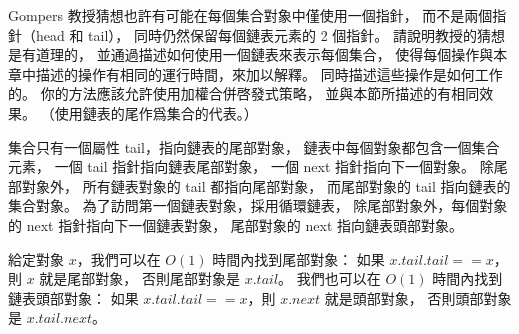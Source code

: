 \startEXERCISE
Gompers 教授猜想也許有可能在每個集合對象中僅使用一個指針，
而不是兩個指針（head 和 tail），
同時仍然保留每個鏈表元素的 2 個指針。
請說明教授的猜想是有道理的，
並通過描述如何使用一個鏈表來表示每個集合，
使得每個操作與本章中描述的操作有相同的運行時間，來加以解釋。
同時描述這些操作是如何工作的。
你的方法應該允許使用加權合併啓發式策略，
並與本節所描述的有相同效果。
（\hint 使用鏈表的尾作爲集合的代表。）
\stopEXERCISE

\startANSWER
集合只有一個屬性 tail，指向鏈表的尾部對象，
鏈表中每個對象都包含一個集合元素，
一個 tail 指針指向鏈表尾部對象，
一個 next 指針指向下一個對象。
除尾部對象外， 所有鏈表對象的 tail 都指向尾部對象，
而尾部對象的 tail 指向鏈表的集合對象。
為了訪問第一個鏈表對象，採用循環鏈表，
除尾部對象外，每個對象的 next 指針指向下一個鏈表對象，
尾部對象的 next 指向鏈表頭部對象。

給定對象 $x$，我們可以在 $O(1)$ 時間內找到尾部對象：
如果 $x.tail.tail == x$，則 $x$ 就是尾部對象，
否則尾部對象是 $x.tail$。
我們也可以在 $O(1)$ 時間內找到鏈表頭部對象：
如果 $x.tail.tail == x$，則 $x.next$ 就是頭部對象，
否則頭部對象是 $x.tail.next$。
\stopANSWER